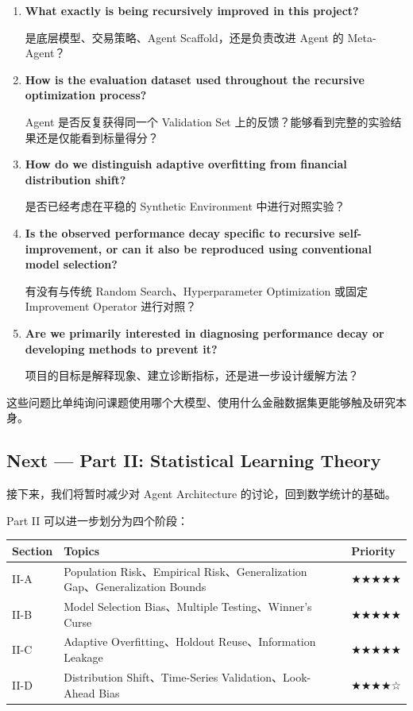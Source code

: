 \begin{enumerate}
\def\labelenumi{\arabic{enumi}.}
\item
  \textbf{What exactly is being recursively improved in this project?}

  是底层模型、交易策略、Agent Scaffold，还是负责改进 Agent 的 Meta-Agent？
\item
  \textbf{How is the evaluation dataset used throughout the recursive optimization process?}

  Agent 是否反复获得同一个 Validation Set 上的反馈？能够看到完整的实验结果还是仅能看到标量得分？
\item
  \textbf{How do we distinguish adaptive overfitting from financial distribution shift?}

  是否已经考虑在平稳的 Synthetic Environment 中进行对照实验？
\item
  \textbf{Is the observed performance decay specific to recursive self-improvement, or can it also be reproduced using conventional model selection?}

  有没有与传统 Random Search、Hyperparameter Optimization 或固定 Improvement Operator 进行对照？
\item
  \textbf{Are we primarily interested in diagnosing performance decay or developing methods to prevent it?}

  项目的目标是解释现象、建立诊断指标，还是进一步设计缓解方法？
\end{enumerate}

这些问题比单纯询问课题使用哪个大模型、使用什么金融数据集更能够触及研究本身。

\hypertarget{part-1-03-0001-next-part-ii-statistical-learning-theory}{%
\subsection{Next --- Part II: Statistical Learning Theory}\label{part-1-03-0001-next-part-ii-statistical-learning-theory}}

接下来，我们将暂时减少对 Agent Architecture 的讨论，回到数学统计的基础。

Part II 可以进一步划分为四个阶段：

\begin{readertable}
\begin{longtable}[]{@{}
  >{\raggedright\arraybackslash}p{}
  >{\raggedright\arraybackslash}p{}
  >{\raggedright\arraybackslash}p{}@{}}
\toprule
Section & Topics & Priority \\
\midrule
\endhead
II-A & Population Risk、Empirical Risk、Generalization Gap、Generalization Bounds & ★★★★★ \\
II-B & Model Selection Bias、Multiple Testing、Winner's Curse & ★★★★★ \\
II-C & Adaptive Overfitting、Holdout Reuse、Information Leakage & ★★★★★ \\
II-D & Distribution Shift、Time-Series Validation、Look-Ahead Bias & ★★★★☆ \\
\bottomrule
\end{longtable}
\end{readertable}

